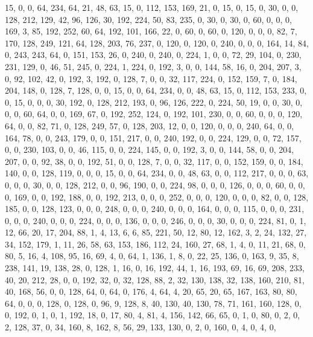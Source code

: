 \begin{DoxyCode}
       15, 0, 0, 64, 234, 64, 21, 48, 63, 15, 0, 112, 153, 169, 21, 0, 15, 0, 15, 0, 30, 0, 0, 128, 212, 129, 42,
       96, 126, 30, 192, 224, 50, 83, 235, 0, 30, 0, 30, 0, 60, 0, 0, 0, 169, 3, 85, 192, 252, 60, 64, 192, 101,
       166, 22, 0, 60, 0, 60, 0, 120, 0, 0, 0, 82, 7, 170, 128, 249, 121, 64, 128, 203, 76, 237, 0, 120, 0, 120, 0,
       240, 0, 0, 0, 164, 14, 84, 0, 243, 243, 64, 0, 151, 153, 26, 0, 240, 0, 240, 0, 224, 1, 0, 0, 72, 29, 104, 0,
       230, 231, 129, 0, 46, 51, 245, 0, 224, 1, 224, 0, 192, 3, 0, 0, 144, 58, 16, 0, 204, 207, 3, 0, 92, 102,
       42, 0, 192, 3, 192, 0, 128, 7, 0, 0, 32, 117, 224, 0, 152, 159, 7, 0, 184, 204, 148, 0, 128, 7, 128, 0, 0, 15,
       0, 0, 64, 234, 0, 0, 48, 63, 15, 0, 112, 153, 233, 0, 0, 15, 0, 0, 0, 30, 192, 0, 128, 212, 193, 0, 96,
       126, 222, 0, 224, 50, 19, 0, 0, 30, 0, 0, 0, 60, 64, 0, 0, 169, 67, 0, 192, 252, 124, 0, 192, 101, 230, 0, 0,
       60, 0, 0, 0, 120, 64, 0, 0, 82, 71, 0, 128, 249, 57, 0, 128, 203, 12, 0, 0, 120, 0, 0, 0, 240, 64, 0, 0, 164,
       78, 0, 0, 243, 179, 0, 0, 151, 217, 0, 0, 240, 192, 0, 0, 224, 129, 0, 0, 72, 157, 0, 0, 230, 103, 0, 0,
       46, 115, 0, 0, 224, 145, 0, 0, 192, 3, 0, 0, 144, 58, 0, 0, 204, 207, 0, 0, 92, 38, 0, 0, 192, 51, 0, 0, 128,
       7, 0, 0, 32, 117, 0, 0, 152, 159, 0, 0, 184, 140, 0, 0, 128, 119, 0, 0, 0, 15, 0, 0, 64, 234, 0, 0, 48, 63,
       0, 0, 112, 217, 0, 0, 0, 63, 0, 0, 0, 30, 0, 0, 128, 212, 0, 0, 96, 190, 0, 0, 224, 98, 0, 0, 0, 126, 0, 0,
       0, 60, 0, 0, 0, 169, 0, 0, 192, 188, 0, 0, 192, 213, 0, 0, 0, 252, 0, 0, 0, 120, 0, 0, 0, 82, 0, 0, 128,
       185, 0, 0, 128, 123, 0, 0, 0, 248, 0, 0, 0, 240, 0, 0, 0, 164, 0, 0, 0, 115, 0, 0, 0, 231, 0, 0, 0, 240, 0, 0,
       0, 224, 0, 0, 0, 136, 0, 0, 0, 246, 0, 0, 0, 30, 0, 0, 0, 224, 81, 0, 1, 12, 66, 20, 17, 204, 88, 1, 4, 13,
       6, 6, 85, 221, 50, 12, 80, 12, 162, 3, 2, 24, 132, 27, 34, 152, 179, 1, 11, 26, 58, 63, 153, 186, 112, 24,
       160, 27, 68, 1, 4, 0, 11, 21, 68, 0, 80, 5, 16, 4, 108, 95, 16, 69, 4, 0, 64, 1, 136, 1, 8, 0, 22, 25, 136,
       0, 163, 9, 35, 8, 238, 141, 19, 138, 28, 0, 128, 1, 16, 0, 16, 192, 44, 1, 16, 193, 69, 16, 69, 208, 233, 40,
       20, 212, 28, 0, 0, 192, 32, 0, 32, 128, 88, 2, 32, 130, 138, 32, 138, 160, 210, 81, 40, 168, 56, 0, 0, 128,
       64, 0, 64, 0, 176, 4, 64, 4, 20, 65, 20, 65, 167, 163, 80, 80, 64, 0, 0, 0, 128, 0, 128, 0, 96, 9, 128, 8,
       40, 130, 40, 130, 78, 71, 161, 160, 128, 0, 0, 192, 0, 1, 0, 1, 192, 18, 0, 17, 80, 4, 81, 4, 156, 142, 66,
       65, 0, 1, 0, 80, 0, 2, 0, 2, 128, 37, 0, 34, 160, 8, 162, 8, 56, 29, 133, 130, 0, 2, 0, 160, 0, 4, 0, 4, 0,

\end{DoxyCode}
